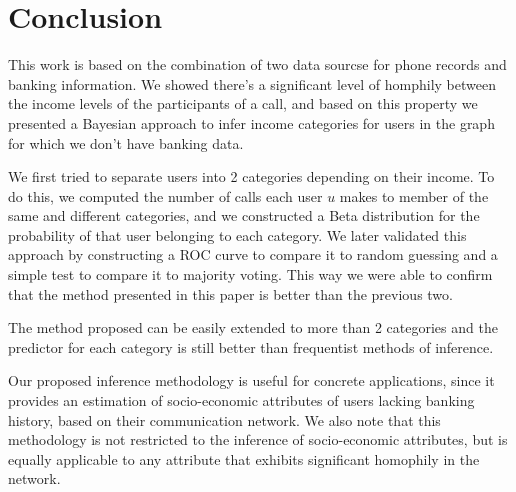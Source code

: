\section{Conclusion}

This work is based on the combination of two data sourcse for phone records and banking information. We showed there's a significant level of homphily between the income levels of the participants of a call, and based on this property we presented a Bayesian approach to infer income categories for users in the graph for which we don't have banking data.

We first tried to separate users into 2 categories depending on their income. To do this, we computed the number of calls each user \( u \) makes to member of the same and different categories, and we constructed a Beta distribution for the probability of that user belonging to each category. We later validated this approach by constructing a ROC curve to compare it to random guessing and a simple test to compare it to majority voting. This way we were able to confirm that the method presented in this paper is better than the previous two.

The method proposed can be easily extended to more than 2 categories and the predictor for each category is still better than frequentist methods of inference.

Our proposed inference methodology is useful for concrete applications, since it provides an estimation of socio-economic attributes of users lacking banking history, based on their communication network. We also note that this methodology is not restricted to the inference of socio-economic attributes, but is equally applicable to any attribute that exhibits significant homophily in the network.

%
%
%
%
%
%

